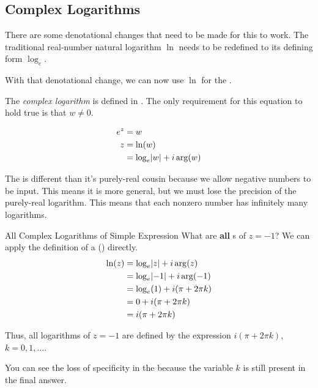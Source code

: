 \subsection{Complex Logarithms}\label{subsec:Complex_Logarithms}
There are some denotational changes that need to be made for this to work.
The traditional real-number natural logarithm $\ln$ needs to be redefined to its defining form $\log_{e}$.

With that denotational change, we can now use $\ln$ for the .

\begin{definition}\label{def:Complex_Logarithm}
  The \emph{complex logarithm} is defined in .
  The only requirement for this equation to hold true is that $w \neq 0$.

  \begin{equation}\label{eq:Complex_Logarithm}
    \begin{aligned}
      e^{z} &= w \\
      z &= \ln(w) \\
      &= \log_{e} \lvert w \rvert + i \arg(w)
    \end{aligned}
  \end{equation}

  \begin{remark}
    The  is different than it's purely-real cousin because we allow negative numbers to be input.
    This means it is more general, but we must lose the precision of the purely-real logarithm.
    This means that each nonzero number has infinitely many logarithms.
  \end{remark}
\end{definition}

\begin{example}[Lecture 3]{All Complex Logarithms of Simple Expression}
  What are \textbf{all} s of $z = -1$?
  \tcblower{}
  We can apply the definition of a  () directly.
  \begin{align*}
    \ln(z) &= \log_{e} \lvert z \rvert + i \arg(z) \\
           &= \log_{e} \lvert -1 \rvert + i \arg(-1) \\
           &= \log_{e} (1) + i (\pi + 2 \pi k) \\
           &= 0 + i (\pi + 2 \pi k) \\
           &= i (\pi + 2 \pi k)
  \end{align*}

  Thus, all logarithms of $z = -1$ are defined by the expression $i (\pi + 2 \pi k)$, $k = 0, 1, \ldots$.

  \begin{remark*}
    You can see the loss of specificity in the  because the variable $k$ is still present in the final answer.
  \end{remark*}
\end{example}

